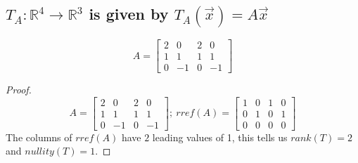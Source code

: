 \documentclass[../main.tex]{subfiles}
\begin{document}
\subsection{$T_A: \mathbb{R}^4 \to \mathbb{R}^3$ is given by $T_A(\vec{x}) = A\vec{x}$ }
$$ {A = \begin{bmatrix}
                                2 & 0  & 2 & 0  \\
                                1 & 1  & 1 & 1  \\
                                0 & -1 & 0 & -1
                        \end{bmatrix}}
$$
\begin{proof}
        \begin{equation*}
                A=\begin{bmatrix}
                        2 & 0  & 2 & 0  \\
                        1 & 1  & 1 & 1  \\
                        0 & -1 & 0 & -1
                \end{bmatrix} ;\ rref( A) =\begin{bmatrix}
                        1 & 0 & 1 & 0 \\
                        0 & 1 & 0 & 1 \\
                        0 & 0 & 0 & 0
                \end{bmatrix}
        \end{equation*}
        The columns of $\displaystyle rref( A)$ have $\displaystyle 2$ leading values of 1, this tells us $\displaystyle rank( T) =2$ and $\displaystyle nullity( T) =1$.
\end{proof}
\end{document}

